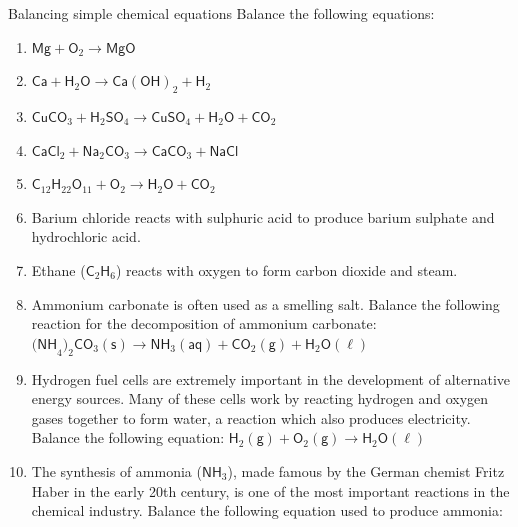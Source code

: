             \begin{exercises}{ Balancing simple chemical equations
        }
            \nopagebreak
 \label{m38726*id65193}Balance the following equations:\par 
 \label{m38726*id65199}\begin{enumerate}[noitemsep, label=\textbf{\arabic*}. ] 
  \label{m38726*uid19}\item  $\mathsf{Mg} + \mathsf{O}_{2} \to \mathsf{MgO}$
\label{m38726*uid20}\item ${\mathsf{Ca}}+{\mathsf{H}}_{2}\mathsf{O} \to \mathsf{Ca(OH)}_{2} + \mathsf{H}_{2}$
\label{m38726*uid21}\item ${\mathsf{CuCO}}_{3} + {\mathsf{H}}_{2}{\mathsf{SO}}_{4} \to \mathsf{CuSO}_{4} + {\mathsf{H}}_{2}\mathsf{O} + {\mathsf{CO}}_{2}$
\label{m38726*uid22}\item $\mathsf{CaCl}_{2} + {\mathsf{Na}}_{2}{\mathsf{CO}}_{3} \to \mathsf{CaCO}_{3} + {\mathsf{NaCl}}$        \label{m38726*uid23}\item ${\mathsf{C}}_{12}{\mathsf{H}}_{22}{\mathsf{O}}_{11} + \mathsf{O}_{2} \to \mathsf{H}_{2}\mathsf{O} + \mathsf{CO}_{2}$
\label{m38726*uid24}\item Barium chloride reacts with sulphuric acid to produce barium sulphate and hydrochloric acid.
\label{m38726*uid25}\item Ethane (${\mathsf{C}}_{2}{\mathsf{H}}_{6}$) reacts with oxygen to form carbon dioxide and steam.
\label{m38726*uid26}\item Ammonium carbonate is often used as a smelling salt. Balance the following reaction for the decomposition of ammonium carbonate: ${\mathsf{(NH}}_{4}\mathsf{)}_{2}{\mathsf{CO}}_{3} \mathsf{(s)} \to {\mathsf{NH}}_{3}\mathsf{(aq)} + {\mathsf{CO}}_{2} \mathsf{(g)} + \mathsf{H}_{2}\mathsf{O} \mathsf{(\ell)} $ 
\label{m38726*uid17}\item Hydrogen fuel cells are extremely important in the development of alternative energy sources. Many of these cells work by reacting hydrogen and oxygen gases together to form water, a reaction which also produces electricity. Balance the following equation: $\mathsf{H}_{2} \mathsf{(g)} + \mathsf{O}_{2} \mathsf{(g)} \to \mathsf{H}_{2}\mathsf{O} \mathsf{(\ell)}$    
\label{m38726*uid18}\item The synthesis of ammonia ($\mathsf{NH}_{3}$), made famous by the German chemist Fritz Haber in the early 20th century, is one of the most important reactions in the chemical industry. Balance the following equation used to produce ammonia:

\end{enumerate}
\end{exercises}
